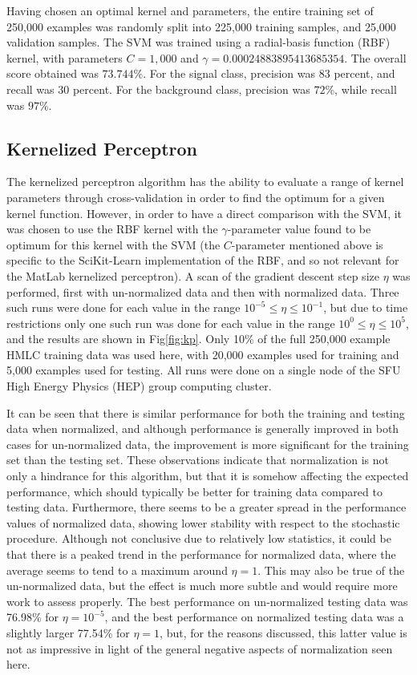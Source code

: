 \documentclass{article} %
\begin{document}
Having chosen an optimal kernel and parameters, the entire training set of 250,000 examples was randomly split into 225,000 training samples, and 25,000 validation samples. The SVM was trained using a radial-basis function (RBF) kernel, with parameters $C=1,000$ and $\gamma=0.00024883895413685354$. The overall score obtained was $73.744$\%. For the signal class, precision was $83$ percent, and recall was $30$ percent. For the background class, precision was $72$\%, while recall was $97$\%.

\subsection{Kernelized Perceptron}
The kernelized perceptron algorithm has the ability to evaluate a range of kernel parameters through cross-validation in order to find the optimum for a given kernel function. However, in order to have a direct comparison with the SVM, it was chosen to use the RBF kernel with the $\gamma$-parameter value found to be optimum for this kernel with the SVM (the $C$-parameter mentioned above is specific to the SciKit-Learn implementation of the RBF, and so not relevant for the MatLab kernelized perceptron). A scan of the gradient descent step size $\eta$ was performed, first with un-normalized data and then with normalized data. Three such runs were done for each value in the range $10^{-5}\le\eta\le10^{-1}$, but due to time restrictions only one such run was done for each value in the range $10^{0}\le\eta\le10^{5}$, and the results are shown in Fig\ref{fig:kp}. Only 10\% of the full 250,000 example HMLC training data was used here, with 20,000 examples used for training and 5,000 examples used for testing. All runs were done on a single node of the SFU High Energy Physics (HEP) group computing cluster.

It can be seen that there is similar performance for both the training and testing data when normalized, and although performance is generally improved in both cases for un-normalized data, the improvement is more significant for the training set than the testing set. These observations indicate that normalization is not only a hindrance for this algorithm, but that it is somehow affecting the expected performance, which should typically be better for training data compared to testing data. Furthermore, there seems to be a greater spread in the performance values of normalized data, showing lower stability with respect to the stochastic procedure. Although not conclusive due to relatively low statistics, it could be that there is a peaked trend in the performance for normalized data, where the average seems to tend to a maximum around $\eta=1$. This may also be true of the un-normalized data, but the effect is much more subtle and would require more work to assess properly. The best performance on un-normalized testing data was 76.98\% for $\eta=10^{-5}$, and the best performance on normalized testing data was a slightly larger 77.54\% for $\eta=1$, but, for the reasons discussed, this latter value is not as impressive in light of the general negative aspects of normalization seen here.
\end{document}

